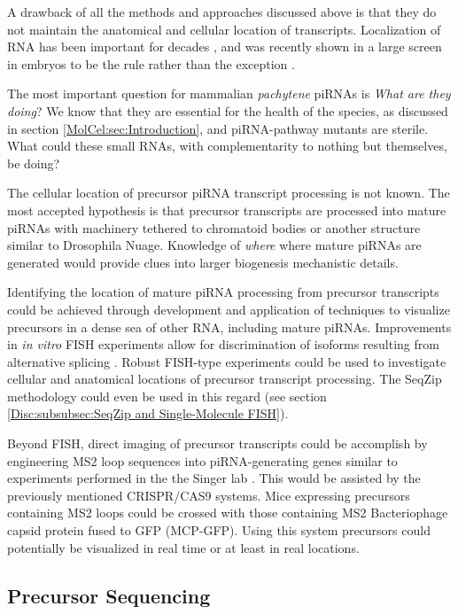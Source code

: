     A drawback of all the methods and approaches discussed above is that they do not maintain the anatomical and cellular location of transcripts. Localization of RNA has been important for decades \citep{Rebagliati1985}, and was recently shown in a large screen in \flies{} embryos to be the rule rather than the exception \citep{Lecuyer2007}.

    The most important question for mammalian \textit{pachytene} piRNAs is \textit{What are they doing}? We know that they are essential for the health of the species, as discussed in section \ref{MolCel:sec:Introduction}, and piRNA-pathway mutants are sterile. What could these small RNAs, with complementarity to nothing but themselves, be doing? 

    The cellular location of precursor piRNA transcript processing is not known. The most accepted hypothesis is that precursor transcripts are processed into mature piRNAs with machinery tethered to chromatoid bodies \citep{Meikar2011,Meikar2014} or another structure similar to Drosophila Nuage. Knowledge of \textit{where} where mature piRNAs are generated would provide clues into larger biogenesis mechanistic details.

    Identifying the location of mature piRNA processing from precursor transcripts could be achieved through development and application of techniques to visualize precursors in a dense sea of other RNA, including mature piRNAs. Improvements in \textit{in vitro} FISH experiments allow for discrimination of isoforms resulting from alternative splicing \citep{Lee2014}. Robust FISH-type experiments could be used to investigate cellular and anatomical locations of precursor transcript processing. The SeqZip methodology could even be used in this regard (see section \ref{Disc:subsubsec:SeqZip and Single-Molecule FISH}).

    Beyond FISH, direct imaging of precursor transcripts could be accomplish by engineering MS2 loop sequences into piRNA-generating genes similar to experiments performed in the the Singer lab \citep{Park2014}. This would be assisted by the previously mentioned CRISPR/CAS9 systems. Mice expressing precursors containing MS2 loops could be crossed with those containing MS2 Bacteriophage capsid protein fused to GFP (MCP-GFP). Using this system precursors could potentially be visualized in real time or at least in real locations.

  \subsection{Precursor Sequencing}
    \label{Disc:subsec:Sequencing of Precursors}

